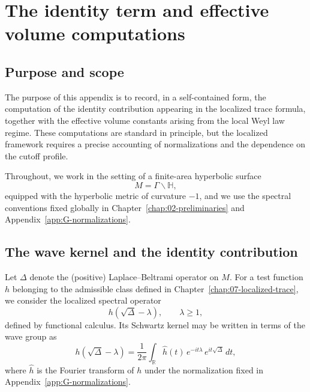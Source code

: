 
\appendix
\chapter{The identity term and effective volume computations}
\label{app:A-identity-effective-volume}

\section{Purpose and scope}
\label{sec:A.scope}

The purpose of this appendix is to record, in a self-contained form, the computation of the identity contribution
appearing in the localized trace formula, together with the effective volume constants arising from the local Weyl
law regime.  These computations are standard in principle, but the localized framework requires a precise accounting
of normalizations and the dependence on the cutoff profile.

Throughout, we work in the setting of a finite-area hyperbolic surface
\[
M = \Gamma \backslash \mathbb{H},
\]
equipped with the hyperbolic metric of curvature $-1$, and we use the spectral conventions fixed globally in
Chapter~\ref{chap:02-preliminaries} and Appendix~\ref{app:G-normalizations}.

\section{The wave kernel and the identity contribution}
\label{sec:A.wave-identity}

Let $\Delta$ denote the (positive) Laplace--Beltrami operator on $M$.  For a test function $h$ belonging to the
admissible class defined in Chapter~\ref{chap:07-localized-trace}, we consider the localized spectral operator
\[
h(\sqrt{\Delta}-\lambda),
\qquad \lambda\ge 1,
\]
defined by functional calculus.  Its Schwartz kernel may be written in terms of the wave group as
\begin{equation}
\label{eq:A.functional-calculus}
h(\sqrt{\Delta}-\lambda)
=
\frac{1}{2\pi}\int_{\mathbb{R}} \widehat{h}(t)\,e^{-it\lambda}\,e^{it\sqrt{\Delta}}\,dt,
\end{equation}
where $\widehat{h}$ is the Fourier transform of $h$ under the normalization fixed in
Appendix~\ref{app:G-normalizations}.

